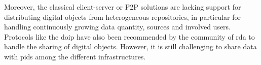 \documentclass[conference]{IEEEtran}
\begin{document}
Moreover, the classical client-server or P2P solutions are lacking support for distributing digital objects from heterogeneous repositories, in particular for handling continuously growing data quantity, sources and involved users. Protocols like the \gls{doip} have also been recommended by the community of \gls{rda} to handle the sharing of digital objects. However, it is still challenging to share data with \glspl{pid} among the different infrastructures.


\end{document}
